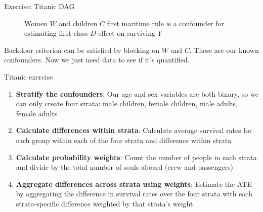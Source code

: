 \documentclass{beamer}
\begin{document}
\begin{frame}{Exercise: Titanic DAG}

\begin{figure}
\begin{center}
\caption{Women $W$ and children $C$ first maritime rule is a confounder for estimating first class $D$ effect on surviving $Y$}
\label{fig:titanic}
\end{center}
\end{figure}

\bigskip

Backdoor criterion can be satisfied by blocking on $W$ and $C$.  These are our known confounders.  Now we just need data to see if it's quantified.

\end{frame}

\begin{frame}{Titanic exercise}

\begin{enumerate}
\item \textbf{Stratify the confounders}: Our age and sex variables are both binary, so we can only create four strata: male children, female children, male adults, female adults
\item \textbf{Calculate differences within strata}: Calculate average survival rates for each group within each of the four strata and difference within strata
\item \textbf{Calculate probability weights}: Count the number of people in each strata and divide by the total number of souls aboard (crew and passengers)
\item \textbf{Aggregate differences across strata using weights}: Estimate the ATE by aggregating the difference in survival rates over the four strata with each strata-specific difference weighted by that strata's weight
\end{enumerate}


\end{frame}
\end{document}
